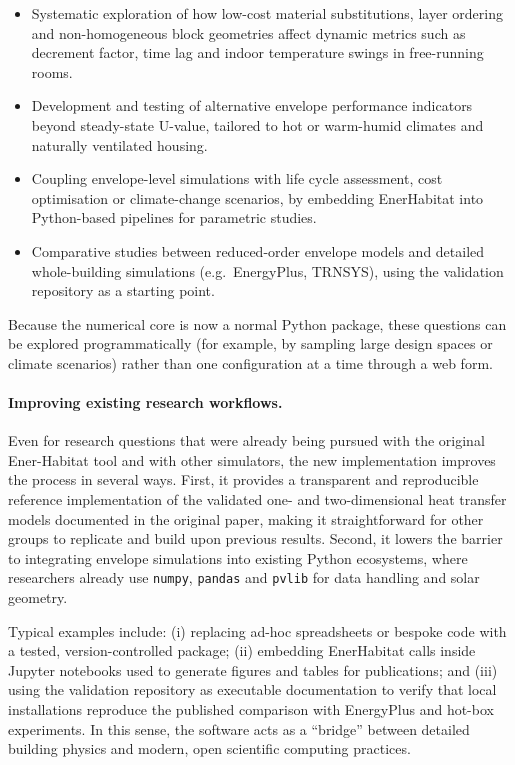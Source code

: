 \documentclass[preprint,12pt, a4paper]{elsarticle}
\begin{document}
\begin{itemize}
\item Systematic exploration of how low-cost material substitutions, layer ordering and non-homogeneous block geometries affect dynamic metrics such as decrement factor, time lag and indoor temperature swings in free-running rooms.
\item Development and testing of alternative envelope performance indicators beyond steady-state U-value, tailored to hot or warm-humid climates and naturally ventilated housing.\citep{barrios2011wall,barrios2012envelope}
\item Coupling envelope-level simulations with life cycle assessment, cost optimisation or climate-change scenarios, by embedding EnerHabitat into Python-based pipelines for parametric studies.
\item Comparative studies between reduced-order envelope models and detailed whole-building simulations (e.g.\ EnergyPlus, TRNSYS), using the validation repository as a starting point.
\end{itemize}

Because the numerical core is now a normal Python package, these questions can be explored programmatically (for example, by sampling large design spaces or climate scenarios) rather than one configuration at a time through a web form.

\paragraph{Improving existing research workflows.}

Even for research questions that were already being pursued with the original Ener-Habitat tool and with other simulators, the new implementation improves the process in several ways. First, it provides a transparent and reproducible reference implementation of the validated one- and two-dimensional heat transfer models documented in the original paper, making it straightforward for other groups to replicate and build upon previous results.\citep{barrios2016enerhabitat} Second, it lowers the barrier to integrating envelope simulations into existing Python ecosystems, where researchers already use \texttt{numpy}, \texttt{pandas} and \texttt{pvlib} for data handling and solar geometry.

Typical examples include: (i) replacing ad-hoc spreadsheets or bespoke code with a tested, version-controlled package; (ii) embedding EnerHabitat calls inside Jupyter notebooks used to generate figures and tables for publications; and (iii) using the validation repository as executable documentation to verify that local installations reproduce the published comparison with EnergyPlus and hot-box experiments. In this sense, the software acts as a “bridge” between detailed building physics and modern, open scientific computing practices.
\end{document}
